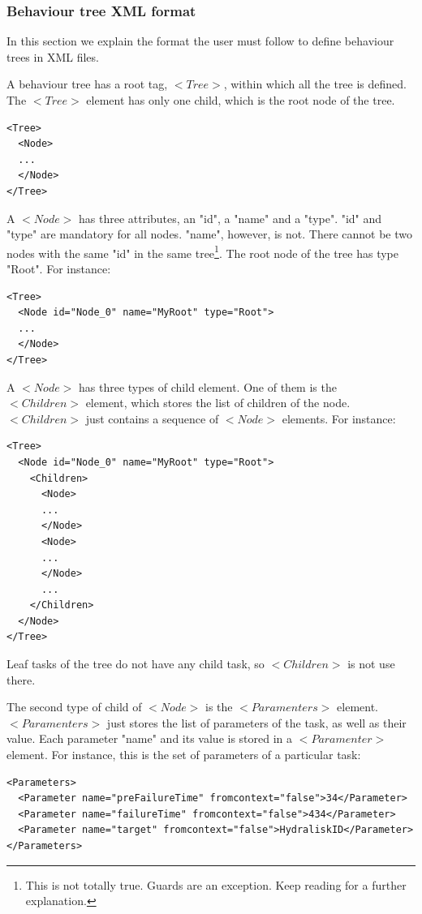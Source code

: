 \documentclass[a4paper,10pt]{article}
\begin{document}
\subsubsection{Behaviour tree XML format}

In this section we explain the format the user must follow to define behaviour trees in XML files.

A behaviour tree has a root tag, $<Tree>$, within which all the tree is defined. The $<Tree>$ element has only one child, which is the root node of the tree.

\begin{verbatim}
<Tree>
  <Node>
  ...
  </Node>
</Tree>
\end{verbatim}

A $<Node>$ has three attributes, an "id", a "name" and a "type". "id" and "type" are mandatory for all nodes. "name", however, is not. There cannot be two nodes with the same "id" in the same tree\footnote{This is not totally true. Guards are an exception. Keep reading for a further explanation.}. The root node of the tree has type "Root". For instance:

\begin{verbatim}
<Tree>
  <Node id="Node_0" name="MyRoot" type="Root">
  ...
  </Node>
</Tree>
\end{verbatim}

A $<Node>$ has three types of child element. One of them is the $<Children>$ element, which stores the list of children of the node. $<Children>$ just contains a sequence of $<Node>$ elements. For instance:

\begin{verbatim}
<Tree>
  <Node id="Node_0" name="MyRoot" type="Root">
    <Children>
      <Node>
      ...
      </Node>
      <Node>
      ...
      </Node>
      ...
    </Children>
  </Node>
</Tree>
\end{verbatim}

Leaf tasks of the tree do not have any child task, so $<Children>$ is not use there.

The second type of child of $<Node>$ is the $<Paramenters>$ element. $<Paramenters>$ just stores the list of parameters of the task, as well as their value. Each parameter "name" and its value is stored in a $<Paramenter>$ element. For instance, this is the set of parameters of a particular task:

\begin{verbatim}
<Parameters>
  <Parameter name="preFailureTime" fromcontext="false">34</Parameter>
  <Parameter name="failureTime" fromcontext="false">434</Parameter>
  <Parameter name="target" fromcontext="false">HydraliskID</Parameter>
</Parameters>
\end{verbatim}
\end{document}
